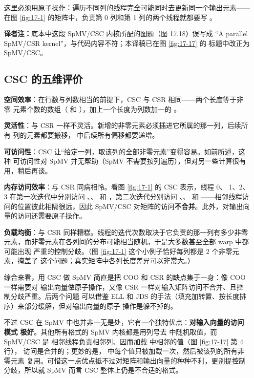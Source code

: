 这里必须用原子操作：遍历不同列的线程完全可能同时去更新同一个输出元素——在图
\ref{fig:17-1} 的矩阵中，负责第 0 列和第 1 列的两个线程就都要写 。

\noindent\textbf{译者注：}底本中这段 SpMV/CSC 内核所配的图题（图 17.18）误写成
“A parallel SpMV/CSR kernel”，与代码内容不符；本译稿已在图 \ref{fig:17-17} 的
标题中改正为 SpMV/CSC。

\subsection*{CSC 的五维评价}

\textbf{空间效率}：在行数与列数相当的前提下，CSC 与 CSR 相同——两个长度等于非零
元素个数的数组（ 和 ），加上一个长度为列数加一的
。

\textbf{灵活性}：与 CSR 一样不灵活。新增的非零元素必须插进它所属的那一列，后续所有
列的元素都要搬移， 中后续所有偏移都要递增。

\textbf{可访问性}：CSC 让“给定一列，取该列的全部非零元素”变得容易。如前所述，这种
可访问性对 SpMV 并无帮助（SpMV 不需要按列遍历），但对另一些计算很有用，稍后再谈。

\textbf{内存访问效率}：与 CSR 同病相怜。看图 \ref{fig:17-1} 的 CSC 表示，线程 0、
1、2、3 在第一次迭代中分别访问 、、
和 ，第二次迭代分别访问 、、
 和 ——相邻线程访问的位置彼此相隔很远，因此
SpMV/CSC 对矩阵的访问\textbf{不合并}。此外，对输出向量的访问还需要原子操作。

\textbf{负载均衡}：与 CSR 同样糟糕。线程的迭代次数取决于它负责的那一列有多少非零
元素，而非零元素在各列间的分布可能相当随机，于是大多数甚至全部 warp 中都可能出现
严重的控制分歧。（图 \ref{fig:17-1} 这个小例子恰好每列都是 2 个非零元素，掩盖了
这个问题；真实矩阵中各列长度差异可以非常大。）

综合来看，用 CSC 做 SpMV 简直是把 COO 和 CSR 的缺点集于一身：像 COO 一样需要对
输出向量做原子操作，又像 CSR 一样对输入矩阵访问不合并、且控制分歧严重。后两个问题
可以借鉴 ELL 和 JDS 的手法（填充加转置、按长度排序）来部分缓解，但对输出向量的原子
操作是躲不掉的。

不过 CSC 在 SpMV 中也并非一无是处，它有一个独特优点：\textbf{对输入向量的访问模式
极好}。其他所有格式的 SpMV 内核都是用列号去  中随机取值，而 SpMV/CSC 是
相邻线程负责相邻列、因而加载  中相邻的值（图 \ref{fig:17-17} 第 4 行），
访问是合并的；更妙的是， 中每个值只被加载一次，然后被该列的所有非零元素
复用。可惜这一点优点抵不过对矩阵和输出向量的种种不利，更别提控制分歧，所以就 SpMV
而言 CSC 整体上仍是不合适的格式。

